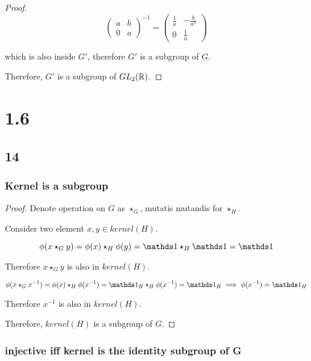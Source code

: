 \begin{enumerate}
\begin{proof}
		      $$
			      \begin{pmatrix}
				      a & b \\
				      0 & a
			      \end{pmatrix}^{-1}=
			      \begin{pmatrix}
				      \frac{1}{a} & -\frac{b}{a^2} \\
				      0           & \frac{1}{a}
			      \end{pmatrix}
		      $$

		      which is also inside $G'$, therefore $G'$ is a subgroup of $G$.

		      Therefore, $G'$ is a subgroup of $GL_2(\mathbb{R})$.
	      \end{proof}
\end{enumerate}

\section*{1.6}

\subsection*{14}

\subsubsection*{Kernel is a subgroup}

\begin{proof}
	Denote operation on $G$ as $\star_G$,
	mutatis mutandis for $\star_H$.

	Consider two element $x,y \in kernel(H)$.

	$$
		\phi(x \star_G y) = \phi(x) \star_H \phi(y) = \one \star_H \one = \one
	$$

	Therefore $x \star_G y$ is also in $kernel(H)$.

	$$
		\phi(x \star_G x^{-1}) = \phi(x) \star_H \phi(x^{-1}) = \one_H \star_H \phi(x^{-1}) = \one_H \implies \phi(x^{-1}) = \one_H
	$$

	Therefore $x^{-1}$ is also in $kernel(H)$.

	Therefore, $kernel(H)$ is a subgroup of $G$.
\end{proof}

\subsubsection*{injective iff kernel is the identity subgroup of G}


